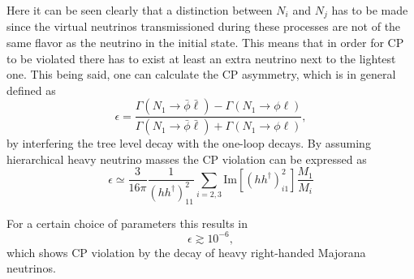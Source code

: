 \noindent
Here it can be seen clearly that a distinction between $N_i$ and $N_j$ has to be made since the virtual neutrinos transmissioned during these processes are not of the same flavor as the neutrino in the initial state. This means that in order for CP to be violated there has to exist at least an extra neutrino next to the lightest one. \newline\indent
This being said, one can calculate the CP asymmetry\cite[pp. 24ff.]{Davidson:2008bu}, which is in general defined as
\begin{equation}
	\epsilon=\frac{\Gamma(N_1\rightarrow\bar{\phi}\bar{\ell})-\Gamma(N_1\rightarrow\phi\ell)}{\Gamma(N_1\rightarrow\bar{\phi}\bar{\ell})+\Gamma(N_1\rightarrow\phi\ell)},
	\label{eq:CP_violation}
\end{equation}
by interfering the tree level decay with the one-loop decays. By assuming hierarchical heavy neutrino masses the CP violation can be expressed as \cite[Eq. (55)]{Buchmuller:2005eh} 
\begin{equation}
	\epsilon\simeq\frac{3}{16\pi}\frac{1}{\left(hh^\dagger\right)^2_{11}}\sum_{i=2,3}\text{Im}\left[\left(hh^\dagger\right)^2_{i1}\right]\frac{M_1}{M_i}
\end{equation}

For a certain choice of parameters this results in \cite[p. 26]{Davidson:2008bu}
\begin{equation}
	\epsilon\gtrsim10^{-6},
	\label{eq:CP_value}
\end{equation}
which shows CP violation by the decay of heavy right-handed Majorana neutrinos. 
